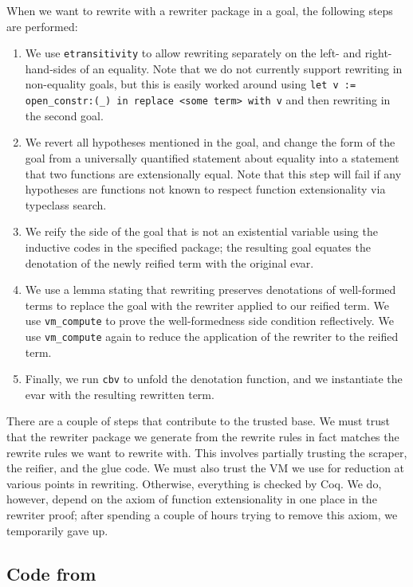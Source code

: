\documentclass[sigplan,10pt,review,anonymous]{acmart}\settopmatter{printfolios=true,printccs=false,printacmref=false}
\begin{document}
When we want to rewrite with a rewriter package in a goal, the following steps are performed:
\begin{enumerate}
    \item
    We use \texttt{etransitivity} to allow rewriting separately on the left- and right-hand-sides of an equality.
    Note that we do not currently support rewriting in non-equality goals, but this is easily worked around using \texttt{let v := open\_constr:(\_) in replace <some term> with v} and then rewriting in the second goal.
    \item
    We revert all hypotheses mentioned in the goal, and change the form of the goal from a universally quantified statement about equality into a statement that two functions are extensionally equal.
    Note that this step will fail if any hypotheses are functions not known to respect function extensionality via typeclass search.
    \item
    We reify the side of the goal that is not an existential variable using the inductive codes in the specified package; the resulting goal equates the denotation of the newly reified term with the original evar.
    \item
    We use a lemma stating that rewriting preserves denotations of well-formed terms to replace the goal with the rewriter applied to our reified term.
    We use \texttt{vm\_compute} to prove the well-formedness side condition reflectively.
    We use \texttt{vm\_compute} again to reduce the application of the rewriter to the reified term.
    \item
    Finally, we run \texttt{cbv} to unfold the denotation function, and we instantiate the evar with the resulting rewritten term.
\end{enumerate}

There are a couple of steps that contribute to the trusted base.
We must trust that the rewriter package we generate from the rewrite rules in fact matches the rewrite rules we want to rewrite with.
This involves partially trusting the scraper, the reifier, and the glue code.
We must also trust the VM we use for reduction at various points in rewriting.
Otherwise, everything is checked by Coq.
We do, however, depend on the axiom of function extensionality in one place in the rewriter proof; after spending a couple of hours trying to remove this axiom, we temporarily gave up.


\subsection{Code from }
\end{document}
